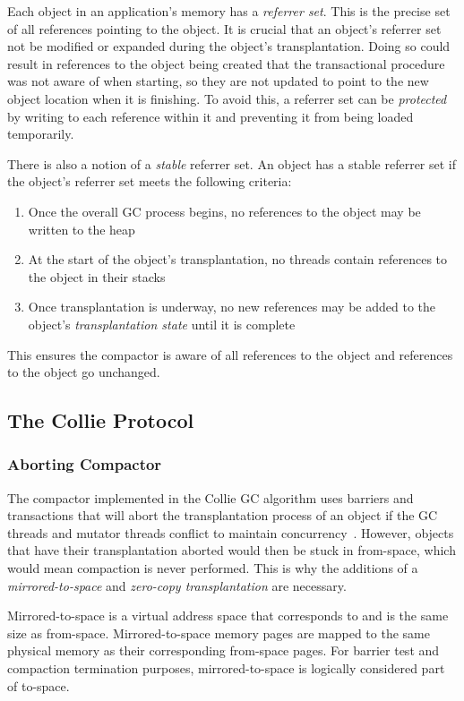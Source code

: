 \documentclass{sig-alternate}
\begin{document}
Each object in an application's memory has a \emph{referrer set}. This is the precise set 
of all references pointing to the object. It is crucial that an object's referrer set not
be modified or expanded during the object's transplantation. Doing so could result
in references to the object being created that the transactional procedure
was not aware of when starting, so they are not updated to point to 
the new object location when it is finishing. To avoid this, a referrer set can be
\emph{protected} by writing to each reference within it and preventing it from
being loaded temporarily.

There is also a notion of a \emph{stable} referrer set. An object has a stable referrer 
set if the object's referrer set meets the following criteria:
\begin{enumerate}
\item Once the overall GC process begins, no references to the object may be written to the heap
\item At the start of the object's transplantation, no threads contain references to the object in their stacks
\item Once transplantation is underway, no new references may be added to the object's \emph{transplantation state} until it is complete
\end{enumerate}
This ensures the compactor is aware of all references to the object
and references to the object go unchanged.


\subsection{The Collie Protocol}
\label{sec:collieAlgorithm}


\subsubsection{Aborting Compactor}
\label{sec:collieAbortion}

The compactor implemented in the Collie GC algorithm uses barriers 
and transactions that will abort the transplantation process of an object if the
GC threads and mutator threads conflict to maintain concurrency~\cite{Iyengar:Collie}.
However, objects that have their transplantation aborted would then be stuck
in from-space, which would mean compaction is never performed. This is why
the additions of a \emph{mirrored-to-space} and \emph{zero-copy transplantation} are necessary.

Mirrored-to-space is a virtual address space that corresponds to and is the same
size as from-space. Mirrored-to-space memory pages are mapped to the same physical
memory as their corresponding from-space pages. For barrier test and compaction 
termination purposes, mirrored-to-space is logically considered part of to-space.
\end{document}
